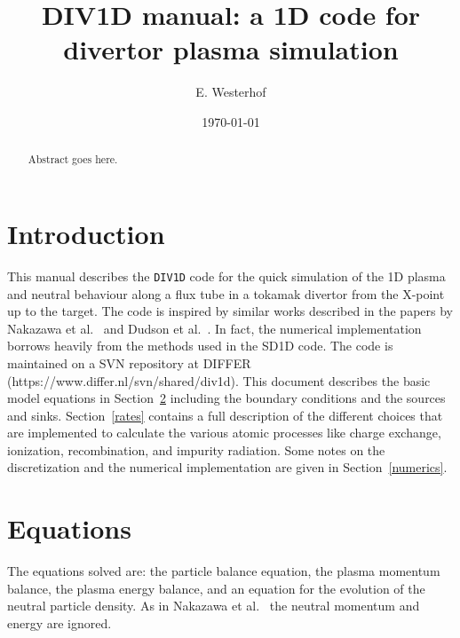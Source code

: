 \documentclass[amsmath,amssymb,a4]{revtex4-2}
\begin{document}
\title[DIV1D manual]{DIV1D manual: a 1D code for divertor plasma simulation}

\author{E. Westerhof}

\address{DIFFER -- Dutch Institute for Fundamental Energy Research, PO Box 6336, 5600HH Eindhoven, The Netherlands, www.differ.nl}

\vspace{10pt}
\date\today


\begin{abstract}
Abstract goes here.
\end{abstract}


\maketitle

\section{Introduction}

This manual describes the {\tt DIV1D} code for the quick simulation of the 1D plasma and neutral behaviour along a flux tube in a tokamak divertor from the X-point up to the target. The code is inspired by similar works described in the papers by Nakazawa et al.~\cite{nakazawa2000} and Dudson et al.~\cite{dudson2019, SD1D}. In fact, the numerical implementation borrows heavily from the methods used in the SD1D code. The code is maintained on a SVN repository at DIFFER (https://www.differ.nl/svn/shared/div1d). This document describes the basic model equations in Section~\ref{basic_equations} including the boundary conditions and the sources and sinks. Section~\ref{rates} contains a full description of the different choices that are implemented to calculate the various atomic processes like charge exchange, ionization, recombination, and impurity radiation. Some notes on the discretization and the numerical implementation are given in Section~\ref{numerics}.


\section{Equations}\label{basic_equations}

The equations solved are: the particle balance equation, the plasma momentum balance, the plasma energy balance, and an equation for the evolution of the neutral particle density. As in Nakazawa et al.~\cite{nakazawa2000} the neutral momentum and energy are ignored.
\end{document}
